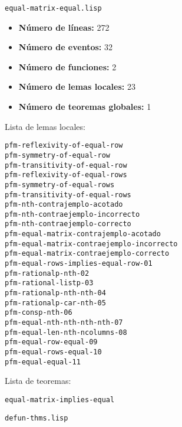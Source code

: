 \documentclass[a4paper,10pt]{article}
\begin{document}
\par \vspace{24pt}
\texttt{equal-matrix-equal.lisp}

\par \vspace{10pt}

\begin{itemize}
	\item \textbf{Número de líneas:} 272
	\item \textbf{Número de eventos:} 32
	\item \textbf{Número de funciones:} 2
	\item \textbf{Número de lemas locales:} 23
	\item \textbf{Número de teoremas globales:} 1
\end{itemize}

\par \vspace{10pt}

Lista de lemas locales:

\par \vspace{10pt}

\begin{lstlisting}[language=clips]
pfm-reflexivity-of-equal-row
pfm-symmetry-of-equal-row
pfm-transitivity-of-equal-row
pfm-reflexivity-of-equal-rows
pfm-symmetry-of-equal-rows
pfm-transitivity-of-equal-rows
pfm-nth-contrajemplo-acotado
pfm-nth-contraejemplo-incorrecto
pfm-nth-contraejemplo-correcto
pfm-equal-matrix-contrajemplo-acotado
pfm-equal-matrix-contraejemplo-incorrecto
pfm-equal-matrix-contraejemplo-correcto
pfm-equal-rows-implies-equal-row-01
pfm-rationalp-nth-02
pfm-rational-listp-03
pfm-rationalp-nth-nth-04
pfm-rationalp-car-nth-05
pfm-consp-nth-06
pfm-equal-nth-nth-nth-nth-07
pfm-equal-len-nth-ncolumns-08
pfm-equal-row-equal-09
pfm-equal-rows-equal-10
pfm-equal-equal-11
\end{lstlisting}

\par \vspace{10pt}

Lista de teoremas:

\par \vspace{10pt}

\begin{lstlisting}[language=clips]
equal-matrix-implies-equal
\end{lstlisting}

\par \vspace{24pt}
\texttt{defun-thms.lisp}
\end{document}
